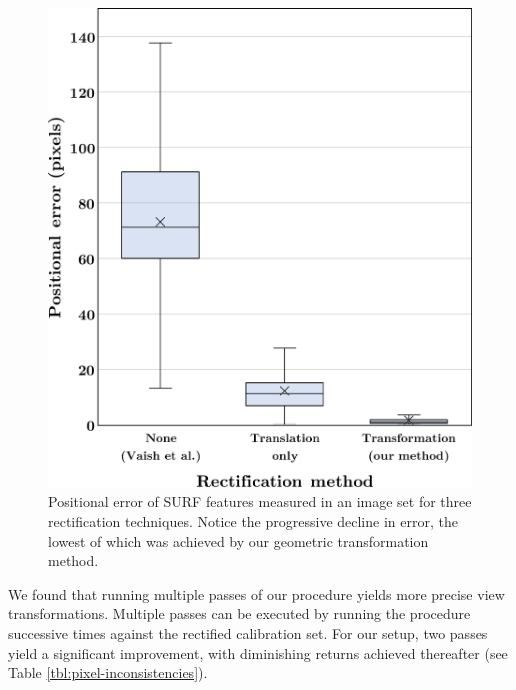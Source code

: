 \documentclass{article} \usepackage{acra}
\begin{document}
\begin{figure}[h] \centering
  \includegraphics[width=\columnwidth]{images/boxplot-pixelerror}
  \caption{Positional error of SURF features measured in an image set for three
    rectification techniques. Notice the progressive decline in error, the
    lowest of which was achieved by our geometric transformation method.}
  \label{fig:boxplot}
\end{figure}

We found that running multiple passes of our procedure yields more precise view
transformations. Multiple passes can be executed by running the procedure
successive times against the rectified calibration set. For our setup, two
passes yield a significant improvement, with diminishing returns achieved
thereafter (see Table \ref{tbl:pixel-inconsistencies}).
\end{document}
